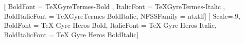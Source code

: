 

\ifluatex
  \usepackage[no-math]{fontspec}
  \setmainfont{TeXGyreTermes-Regular}[
       BoldFont       = TeXGyreTermes-Bold ,
       ItalicFont     = TeXGyreTermes-Italic ,
       BoldItalicFont = TeXGyreTermes-BoldItalic,
       NFSSFamily     = ntxtlf]
  \setsansfont{TeX Gyre Heros Regular}[
       Scale=.9,
       BoldFont       = TeX Gyre Heros Bold,
       ItalicFont     = TeX Gyre Heros Italic,
       BoldItalicFont = TeX Gyre Heros BoldItalic]
  \setmonofont[StylisticSet={1,3},Scale=.9]{inconsolata}
  \RequirePackage{newtxmath}
\else
  \RequirePackage{newtxtext}
  \RequirePackage{newtxmath}
  \RequirePackage[varl,scaled=.9]{inconsolata}
\fi






